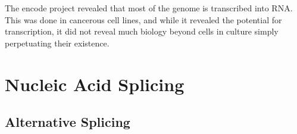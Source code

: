 
The encode project revealed that most of the genome is transcribed into RNA. This was done in cancerous cell lines, and while it revealed the potential for transcription, it did not reveal much biology beyond cells in culture simply perpetuating their existence. 

\section{Nucleic Acid Splicing}
\subsection{Alternative Splicing}





